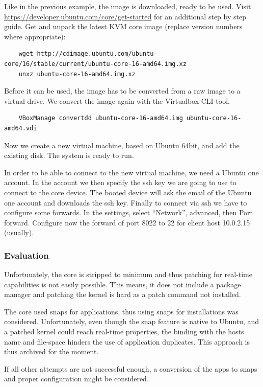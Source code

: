 \documentclass[]{scrartcl}
\begin{document}
Like in the previous example, the image is downloaded, ready to be used. Visit \url{https://developer.ubuntu.com/core/get-started} for an additional step by step guide.
Get and unpack the latest KVM core image (replace version numbers where appropriate):

\begin{verbatim}
	wget http://cdimage.ubuntu.com/ubuntu-core/16/stable/current/ubuntu-core-16-amd64.img.xz
	unxz ubuntu-core-16-amd64.img.xz
\end{verbatim}

Before it can be used, the image has to be converted from a raw image to a virtual drive. We convert the image again with the Virtualbox CLI tool.

\begin{verbatim}
	VBoxManage convertdd ubuntu-core-16-amd64.img ubuntu-core-16-amd64.vdi
\end{verbatim}

Now we create a new virtual machine, based on Ubuntu 64bit, and add the existing disk. The system is ready to run.

In order to be able to connect to the new virtual machine, we need a Ubuntu one account. In the account we then specify the ssh key we are going to use to connect to the core device. The booted device will ask the email of the Ubuntu one account and downloads the ssh key. Finally to connect via ssh we have to configure some forwards. In the settings, select ``Network'', advanced, then Port forward. Configure now the forward of port 8022 to 22 for client host 10.0.2.15 (usually).

\subsubsection{Evaluation}

Unfortunately, the core is stripped to minimum and thus patching for real-time capabilities is not easily possible. This means, it does not include a package manager and patching the kernel is hard as a patch command not installed.

The core used snaps for applications, thus using snaps for installations was considered. Unfortunately, even though the snap feature is native to Ubuntu, and a patched kernel could reach real-time properties, the binding with the hosts name and file-space hinders the use of application duplicates. This approach is thus archived for the moment.

If all other attempts are not successful enough, a conversion of the apps to snaps and proper configuration might be considered.
\end{document}
